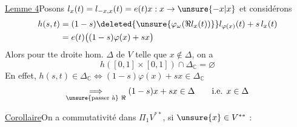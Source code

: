 \uline{Lemme 4}\quad Posons
$l_x(t)=l_{-x,x}(t)=e(t)x:x\to\unsure{-x|x}$
et considérons
\[
\begin{aligned}
h(s,t)&=(1-s)\deleted{\unsure{\varphi_\omega(\Re l_x(t))}}l_{\varphi(x)}(t)+s\,l_x(t)\\
&=e(t)\bigl((1-s)\varphi(x)+sx\bigr)
\end{aligned}
\]
Alors pour tte droite hom. $\Delta$ de $V$
 telle que $x\notin\Delta$, on a
\[
h([0,1]\times[0,1])\cap\Delta_{\mathbb C}=\varnothing
\]
En effet, $h(s,t)\in\Delta_{\mathbb C}\Longleftrightarrow
(1-s)\varphi(x)+sx\in\Delta_{\mathbb C}$
\[
\underset{\text{\unsure{passer à} }\Re}{\Longrightarrow}
(1-s)x+sx\in\Delta\qquad\text{i.e. }x\in\Delta
\]

\uline{Corollaire}\quad On a commutativité dans
$\Pi_1V^{**}$, si $\unsure{x}\in V^{**}$ :
